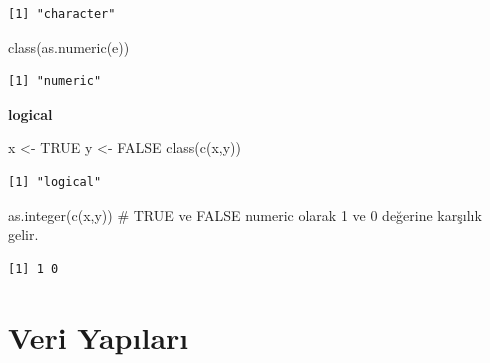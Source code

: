 \documentclass[
  letterpaper,
  DIV=11,
  numbers=noendperiod]{scrreprt}
\newenvironment{Shaded}{\begin{snugshade}}{\end{snugshade}}
\newcommand{\CommentTok}[1]{\textcolor[rgb]{0.37,0.37,0.37}{#1}}
\newcommand{\ConstantTok}[1]{\textcolor[rgb]{0.56,0.35,0.01}{#1}}
\newcommand{\FunctionTok}[1]{\textcolor[rgb]{0.28,0.35,0.67}{#1}}
\newcommand{\NormalTok}[1]{\textcolor[rgb]{0.00,0.23,0.31}{#1}}
\newcommand{\OtherTok}[1]{\textcolor[rgb]{0.00,0.23,0.31}{#1}}
\begin{document}
\begin{verbatim}
[1] "character"
\end{verbatim}

\begin{Shaded}
\begin{Highlighting}[]
\FunctionTok{class}\NormalTok{(}\FunctionTok{as.numeric}\NormalTok{(e))}
\end{Highlighting}
\end{Shaded}

\begin{verbatim}
[1] "numeric"
\end{verbatim}

\textbf{logical}

\begin{Shaded}
\begin{Highlighting}[]
\NormalTok{x }\OtherTok{\textless{}{-}} \ConstantTok{TRUE}
\NormalTok{y }\OtherTok{\textless{}{-}} \ConstantTok{FALSE}
\FunctionTok{class}\NormalTok{(}\FunctionTok{c}\NormalTok{(x,y))}
\end{Highlighting}
\end{Shaded}

\begin{verbatim}
[1] "logical"
\end{verbatim}

\begin{Shaded}
\begin{Highlighting}[]
\FunctionTok{as.integer}\NormalTok{(}\FunctionTok{c}\NormalTok{(x,y)) }\CommentTok{\# TRUE ve FALSE numeric olarak 1 ve 0 değerine karşılık gelir.}
\end{Highlighting}
\end{Shaded}

\begin{verbatim}
[1] 1 0
\end{verbatim}

\section{Veri Yapıları}\label{veri-yapux131larux131}
\end{document}
